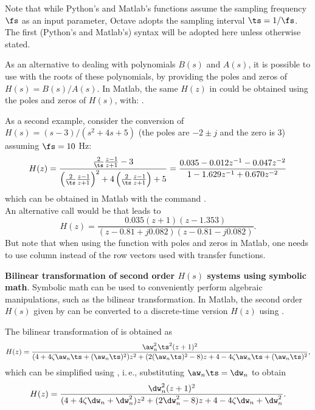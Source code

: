 Note that while Python's and Matlab's  functions assume the sampling frequency $\fs$ as an input parameter, Octave adopts the sampling interval $\ts=1/\fs$. The first (Python's and Matlab's) syntax will be adopted here unless otherwise stated.

As an alternative to dealing with polynomials $B(s)$ and $A(s)$, it is possible to use  with the roots of these polynomials, by providing the poles and zeros of $H(s)=B(s)/A(s)$. In Matlab, the same $H(z)$ in  could be obtained using the poles and zeros of $H(s)$, with: .

As a second example, consider the conversion of $H(s)=(s-3)/(s^2+4s+5)$ (the poles are $-2 \pm j$ and the zero is $3$) assuming $\fs=10$ Hz:
\[
H(z) = \frac{ {\frac{2}{\ts} \frac{z-1}{z+1}} - 3}{ \left({\frac{2}{\ts} \frac{z-1}{z+1}}\right)^2+4 \left({\frac{2}{\ts} \frac{z-1}{z+1}}\right)+5 } = \frac{0.035   -0.012 z^{-1}   -0.047z^{-2}}{1   -1.629z^{-1} + 0.670z^{-2}}
\]
which can be obtained in Matlab with the command .\\An alternative call would be
 that leads to
\begin{equation}
H(z) = \frac{0.035(z+1)(z-1.353)}{(z-0.81+j0.082)(z-0.81-j0.082)}.
\label{eq:example_of_hz_zeros}
\end{equation}
But note that when using the function  with poles and zeros in Matlab, one needs to use column instead of the row vectors used with transfer functions.
\eExample 


\bExample \textbf{Bilinear transformation of second order $H(s)$ systems using symbolic math}.
Symbolic math can be used to conveniently perform algebraic manipulations, such as the bilinear transformation.
In Matlab, the second order $H(s)$ given by  can be converted to a discrete-time version $H(z)$ using .


The bilinear transformation of  is obtained as
\begin{equation}
H(z) = \frac{\aw_n^2 \ts^2 (z+1)^2}{(4 + 4 \zeta \aw_n \ts + (\aw_n \ts)^2) z^2 + (2(\aw_n \ts)^2-8) z + 4 - 4 \zeta \aw_n \ts + (\aw_n \ts)^2},
\label{eq:sosBilinear1}
\end{equation}
which can be simplified using , i.\,e., substituting $\aw_n \ts = \dw_n$ to obtain
\begin{equation}
H(z) = \frac{\dw_n^2 (z+1)^2}{(4 + 4 \zeta \dw_n  + \dw_n^2) z^2 + (2\dw_n^2-8) z + 4 - 4 \zeta \dw_n + \dw_n^2}.
\end{equation}

